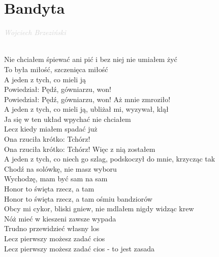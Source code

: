 \documentclass[a5paper, 10pt]{book}
\begin{document}
\newpage
\section{Bandyta}\textcolor{lightgray}{\textit{Wojciech Brzeziński}}\\~\\
\begin{minipage}[t]{0.81\textwidth}
  Nie chciałem śpiewać ani pić i bez niej nie umiałem żyć\\
  To była miłość, szczenięca miłość\\
  \hspace*{5mm}  A jeden z tych, co mieli ją\\
  \hspace*{5mm}  Powiedział: Pędź, gówniarzu, won!\\
  \hspace*{5mm}  Powiedział: Pędź, gówniarzu, won! Aż mnie zmroziło!\\

  A jeden z tych, co mieli ją, ubliżał mi, wyzywał, klął\\
  Ja się w ten układ wpychać nie chciałem\\
  \hspace*{5mm}Lecz kiedy miałem spadać już\\
  \hspace*{5mm}Ona rzuciła krótko: Tchórz!\\
  \hspace*{5mm}Ona rzuciła krótko: Tchórz! Więc z nią zostałem\\

  A jeden z tych, co niech go szlag, podskoczył do mnie, krzycząc tak\\
  Chodź na solówkę, nie masz wyboru\\
  \hspace*{5mm}Wychodzę, mam być sam na sam\\
  \hspace*{5mm}Honor to święta rzecz, a tam\\
  \hspace*{5mm}Honor to święta rzecz, a tam ośmiu bandziorów\\

  Obcy mi cykor, bliski gniew, nie mdlałem nigdy widząc krew\\
  Nóż mieć w kieszeni zawsze wypada\\
  \hspace*{5mm}Trudno przewidzieć własny los\\
  \hspace*{5mm}Lecz pierwszy możesz zadać cios\\
  \hspace*{5mm}Lecz pierwszy możesz zadać cios - to jest zasada\\


\end{minipage}
\end{document}
